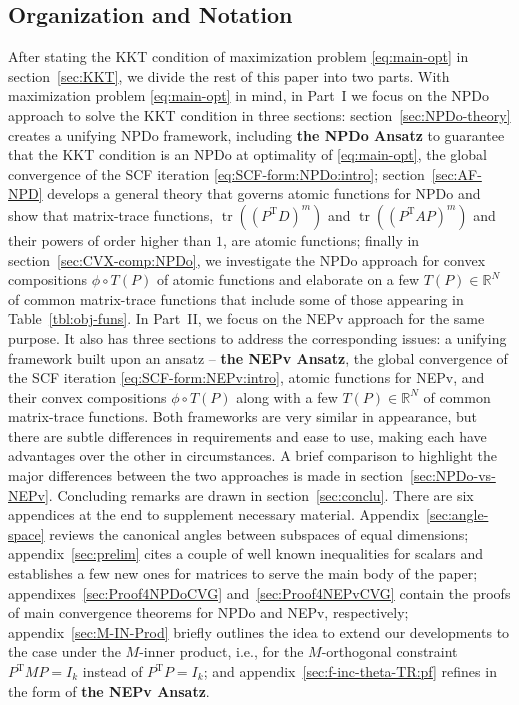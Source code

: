 \documentclass[11pt]{article}
\def\bbR{\mathbb{R}}
\def\scrH{\mathscr{H}}
\DeclareMathOperator{\tr}{tr}
\DeclareMathOperator{\T}{T}
\def\Blue{\textcolor{blue}}
\theoremstyle{definition}
\numberwithin{equation}{section}
\begin{document}
\subsection{Organization and Notation}
After stating the KKT condition of maximization problem \eqref{eq:main-opt} in section~\ref{sec:KKT}, we divide
the rest of this paper into two parts. With maximization problem \eqref{eq:main-opt} in mind, in Part~I we
focus on the NPDo approach to solve the KKT condition  in three sections:
section~\ref{sec:NPDo-theory} creates a unifying NPDo framework, including {\bf the NPDo Ansatz}
to guarantee that the KKT condition is an NPDo at optimality of \eqref{eq:main-opt},
 the global convergence of the SCF iteration \eqref{eq:SCF-form:NPDo:intro}; section~\ref{sec:AF-NPD} develops a general theory that
governs atomic functions for NPDo and show that matrix-trace functions, $\tr((P^{\T}D)^m)$ and $\tr((P^{\T}AP)^m)$
and their powers of order higher than $1$, are atomic functions;
finally in section~\ref{sec:CVX-comp:NPDo}, we investigate the NPDo approach for convex compositions $\phi\circ T(P)$ of atomic functions and elaborate on a few  $T(P)\in\bbR^N$ of common matrix-trace functions that include some of
those appearing in Table~\ref{tbl:obj-funs}.
In Part~II, we focus on the NEPv approach for the same purpose. It also has three sections to address
the corresponding issues: a unifying framework built upon an ansatz -- {\bf the NEPv Ansatz},
the global convergence of the SCF iteration \eqref{eq:SCF-form:NEPv:intro}, atomic functions for NEPv, and their convex compositions $\phi\circ T(P)$  along with a few  $T(P)\in\bbR^N$ of common matrix-trace functions.
Both frameworks are very similar in appearance, but there are subtle differences in requirements
and ease to use, making each have advantages
over the other in circumstances.
A brief comparison to highlight the major differences between the two approaches is made in section~\ref{sec:NPDo-vs-NEPv}.
Concluding remarks are drawn in section~\ref{sec:conclu}. There are six appendices at the end to supplement necessary material.
Appendix~\ref{sec:angle-space} reviews
the canonical angles between subspaces of equal dimensions;
appendix~\ref{sec:prelim} cites a couple of well known inequalities for scalars and
establishes a few new ones for matrices to serve the main body of the paper;
appendixes~\ref{sec:Proof4NPDoCVG} and~\ref{sec:Proof4NEPvCVG} contain the proofs of main convergence theorems for NPDo
and NEPv, respectively;
appendix~\ref{sec:M-IN-Prod} briefly outlines the idea to
extend our developments to the case under the $M$-inner product, i.e., for the $M$-orthogonal constraint $P^{\T}MP=I_k$ instead of $P^{\T}P=I_k$;
and appendix~\ref{sec:f-inc-theta-TR:pf} refines \cite[Theorem 2.2]{wazl:2023} in the form of   {\bf the NEPv Ansatz}.
\end{document}
